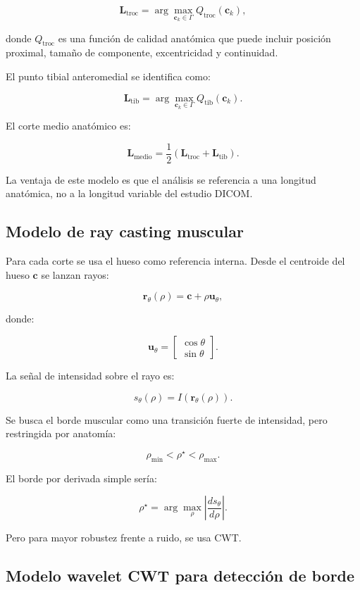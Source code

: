 \documentclass[12pt,a4paper]{article}
\begin{document}
\[
\mathbf{L}_{\text{troc}}
=
\arg\max_{\mathbf{c}_k\in\Gamma}
Q_{\text{troc}}(\mathbf{c}_k),
\]

donde \(Q_{\text{troc}}\) es una función de calidad anatómica que puede incluir posición proximal, tamaño de componente, excentricidad y continuidad.

El punto tibial anteromedial se identifica como:

\[
\mathbf{L}_{\text{tib}}
=
\arg\max_{\mathbf{c}_k\in\Gamma}
Q_{\text{tib}}(\mathbf{c}_k).
\]

El corte medio anatómico es:

\[
\mathbf{L}_{\text{medio}}
=
\frac{1}{2}
\left(
\mathbf{L}_{\text{troc}}+\mathbf{L}_{\text{tib}}
\right).
\]

La ventaja de este modelo es que el análisis se referencia a una longitud anatómica, no a la longitud variable del estudio DICOM.

\subsection{Modelo de ray casting muscular}

Para cada corte se usa el hueso como referencia interna. Desde el centroide del hueso \(\mathbf{c}\) se lanzan rayos:

\[
\mathbf{r}_{\theta}(\rho)
=
\mathbf{c}
+
\rho
\mathbf{u}_{\theta},
\]

donde:

\[
\mathbf{u}_{\theta}
=
\begin{bmatrix}
\cos\theta\\
\sin\theta
\end{bmatrix}.
\]

La señal de intensidad sobre el rayo es:

\[
s_{\theta}(\rho)
=
I(\mathbf{r}_{\theta}(\rho)).
\]

Se busca el borde muscular como una transición fuerte de intensidad, pero restringida por anatomía:

\[
\rho_{\min}
<
\rho^\star
<
\rho_{\max}.
\]

El borde por derivada simple sería:

\[
\rho^\star =
\arg\max_{\rho}
\left|
\frac{ds_{\theta}}{d\rho}
\right|.
\]

Pero para mayor robustez frente a ruido, se usa CWT.

\subsection{Modelo wavelet CWT para detección de borde}
\end{document}
